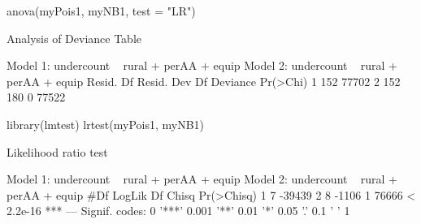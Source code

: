 \begin{Schunk}
\begin{Sinput}
 anova(myPois1, myNB1, test = "LR")
\end{Sinput}
\begin{Soutput}
Analysis of Deviance Table

Model 1: undercount ~ rural + perAA + equip
Model 2: undercount ~ rural + perAA + equip
  Resid. Df Resid. Dev Df Deviance Pr(>Chi)
1       152      77702                     
2       152        180  0    77522         
\end{Soutput}
\begin{Sinput}
 library(lmtest)
 lrtest(myPois1, myNB1)
\end{Sinput}
\begin{Soutput}
Likelihood ratio test

Model 1: undercount ~ rural + perAA + equip
Model 2: undercount ~ rural + perAA + equip
  #Df LogLik Df Chisq Pr(>Chisq)    
1   7 -39439                        
2   8  -1106  1 76666  < 2.2e-16 ***
---
Signif. codes:  0 '***' 0.001 '**' 0.01 '*' 0.05 '.' 0.1 ' ' 1
\end{Soutput}
\end{Schunk}
